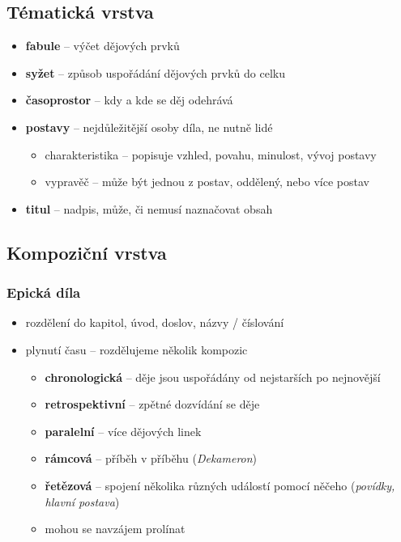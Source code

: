 \documentclass[10pt,a4paper]{article}
\begin{document}
\subsection{Tématická vrstva}
\begin{itemize}
\item[] \textbf{fabule} -- výčet dějových prvků
\item[] \textbf{syžet} -- způsob uspořádání dějových prvků do celku
\item[] \textbf{časoprostor} -- kdy a kde se děj odehrává
\item[] \textbf{postavy} -- nejdůležitější osoby díla, ne nutně lidé
\begin{itemize}
\item charakteristika -- popisuje vzhled, povahu, minulost, vývoj postavy
\item vypravěč -- může být jednou z postav, oddělený, nebo více postav
\end{itemize}
\item[] \textbf{titul} -- nadpis, může, či nemusí naznačovat obsah
\end{itemize}

\subsection{Kompoziční vrstva}
\subsubsection{Epická díla}
\begin{itemize}
\item rozdělení do kapitol, úvod, doslov, názvy / číslování
\item plynutí času -- rozdělujeme několik kompozic
\begin{itemize}
\item \textbf{chronologická} -- děje jsou uspořádány od nejstarších po nejnovější
\item \textbf{retrospektivní} -- zpětné dozvídání se děje
\item \textbf{paralelní} -- více dějových linek
\item \textbf{rámcová} -- příběh v příběhu (\textit{Dekameron})
\item \textbf{řetězová} -- spojení několika různých událostí pomocí něčeho (\textit{povídky, hlavní postava})
\item mohou se navzájem prolínat
\end{itemize}
\end{itemize}
\end{document}
